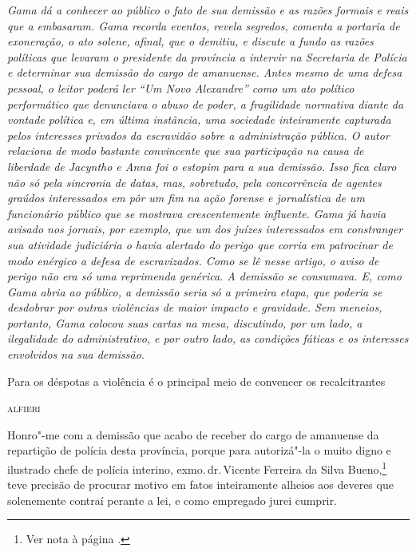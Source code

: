 \begin{flushleft}
{\footnotesize\itshape
Gama dá a conhecer ao público o fato de sua demissão e as razões
formais e reais que a embasaram. Gama recorda eventos, revela segredos,
comenta a portaria de exoneração, o ato solene, afinal, que o demitiu, e
discute a fundo as razões políticas que levaram o presidente da
província a intervir na Secretaria de Polícia e determinar sua demissão
do cargo de amanuense. Antes mesmo de uma defesa pessoal, o leitor
poderá ler ``Um Novo Alexandre'' como um ato político performático que
denunciava o abuso de poder, a fragilidade normativa diante da vontade
política e, em última instância, uma sociedade inteiramente capturada
pelos interesses privados da escravidão sobre a administração pública. O
autor relaciona de modo bastante convincente que sua participação na
causa de liberdade de Jacyntho e Anna foi o estopim para a sua demissão.
Isso fica claro não só pela sincronia de datas, mas, sobretudo, pela
concorrência de agentes graúdos
interessados em pôr um fim na ação forense e jornalística de um
funcionário público que se mostrava crescentemente influente. Gama já
havia avisado nos jornais, por exemplo, que um dos juízes interessados
em constranger sua atividade judiciária o havia alertado do perigo que
corria em patrocinar de modo enérgico a defesa de escravizados. Como se
lê nesse artigo, o aviso de perigo não era só uma reprimenda genérica. A
demissão se consumava. E, como Gama abria ao público, a demissão seria
só a primeira etapa, que poderia se desdobrar por outras violências de
maior impacto e gravidade. Sem meneios, portanto, Gama colocou suas
cartas na mesa, discutindo, por um lado, a ilegalidade do
administrativo, e por outro lado, as condições fáticas e os interesses
envolvidos na sua demissão. }
\end{flushleft}

\epigraph{Para os déspotas a violência é o principal meio de convencer os
recalcitrantes}{\textsc{alfieri}\footnotemark}

\noindent{}Honro"-me com a demissão que acabo de receber do cargo de amanuense da
repartição de polícia desta província, porque para autorizá"-la o muito
digno e ilustrado chefe de polícia interino, exmo.\,dr.\,Vicente Ferreira
da Silva Bueno,\footnote{Ver nota à página \pageref{bueno}.} teve
precisão de procurar motivo em fatos inteiramente alheios aos deveres
que solenemente contraí perante a lei, e como empregado jurei cumprir.


